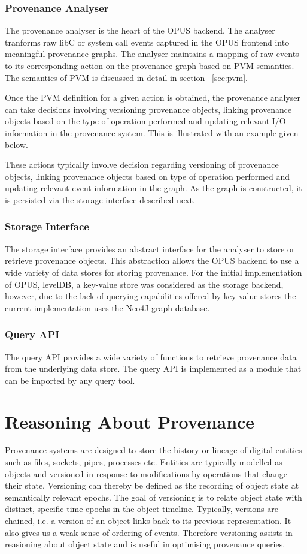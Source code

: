 \documentclass[withindex,glossary]{cam-thesis}
\begin{document}
\subsubsection{Provenance Analyser}
The provenance analyser is the heart of the OPUS backend.
The analyser tranforms raw libC or system call events captured in the OPUS frontend into meaningful provenance graphs.
The analyser maintains a mapping of raw events to its corresponding action on the provenance graph based on PVM semantics.
The semantics of PVM is discussed in detail in section ~\ref{sec:pvm}.

Once the PVM definition for a given action is obtained, the provenance analyser can take decisions involving versioning provenance objects, linking provenance objects based on the type of operation performed and updating relevant I/O information in the provenance system.
This is illustrated with an example given below.

These actions typically involve decision regarding versioning of provenance objects, linking provenance objects based on type of operation performed and updating relevant event information in the graph.
As the graph is constructed, it is persisted via the storage interface described next.

\subsubsection{Storage Interface}
The storage interface provides an abstract interface for the analyser to store or retrieve provenance objects.
This abstraction allows the OPUS backend to use a wide variety of data stores for storing provenance.
For the initial implementation of OPUS, levelDB, a key-value store was considered as the storage backend, however, due to the lack of querying capabilities offered by key-value stores the current implementation uses the Neo4J graph database.

\subsubsection{Query API}
The query API provides a wide variety of functions to retrieve provenance data from the underlying data store.
The query API is implemented as a module that can be imported by any query tool.

\section{Reasoning About Provenance}
Provenance systems are designed to store the history or lineage of digital entities such as files, sockets, pipes, processes etc.
Entities are typically modelled as objects and versioned in response to modifications by operations that change their state.
Versioning can thereby be defined as the recording of object state at semantically relevant epochs.
The goal of versioning is to relate object state with distinct, specific time epochs in the object timeline.
Typically, versions are chained, i.e. a version of an object links back to its previous representation.
It also gives us a weak sense of ordering of events.
Therefore versioning assists in reasioning about object state and is useful in optimising provenance queries.
\end{document}
